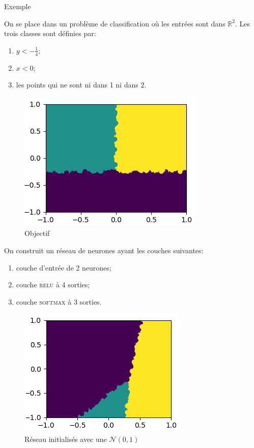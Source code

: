 \documentclass[ebook,10pt,oneside,openany,final, french, a4paper]{memoir}
\begin{document}
\newpage

\begin{center}
\LARGE{Exemple}
\end{center}

\vspace{2em}

On se place dans un problème de classification où les entrées sont dans $\mathbb{R}^2$. 
Les trois classes sont définies par:
\begin{enumerate}
  \item $ y < -\frac{1}{4}$;
  \item $ x < 0$;
  \item les points qui ne sont ni dans 1 ni dans 2.
\end{enumerate}

\begin{figure}[h]
  \centering
  \includegraphics[scale=0.6]{assets/target}
  \caption{Objectif}
\end{figure}

On construit un réseau de neurones ayant les couches suivantes:
\begin{enumerate}
  \item couche d'entrée de 2 neurones;
  \item couche \textsc{relu} à 4 sorties;
  \item couche \textsc{softmax} à 3 sorties.
\end{enumerate}

\begin{figure}[h]
  \centering
  \includegraphics[scale=0.7]{assets/random}
  \caption{Réseau initialisés avec une $\mathcal{N}(0, 1)$}
\end{figure}
\end{document}
